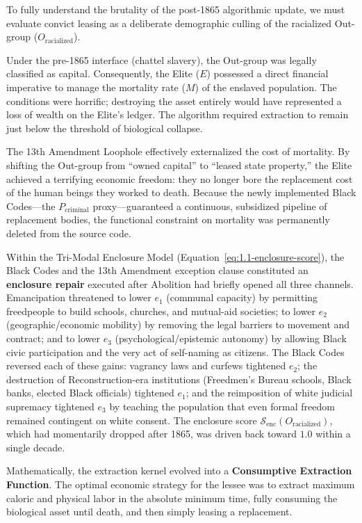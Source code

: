 To fully understand the brutality of the post-1865 algorithmic update, we must evaluate convict leasing as a deliberate demographic culling of the racialized Out-group ($O_{\text{racialized}}$).

Under the pre-1865 interface (chattel slavery), the Out-group was legally classified as capital. Consequently, the Elite ($E$) possessed a direct financial imperative to manage the mortality rate ($M$) of the enslaved population. The conditions were horrific; destroying the asset entirely would have represented a loss of wealth on the Elite's ledger. The algorithm required extraction to remain just below the threshold of biological collapse.

The 13th Amendment Loophole effectively externalized the cost of mortality. By shifting the Out-group from ``owned capital'' to ``leased state property,'' the Elite achieved a terrifying economic freedom: they no longer bore the replacement cost of the human beings they worked to death. Because the newly implemented Black Codes---the $P_{\text{criminal}}$ proxy---guaranteed a continuous, subsidized pipeline of replacement bodies, the functional constraint on mortality was permanently deleted from the source code.

Within the Tri-Modal Enclosure Model (Equation~\ref{eq:1.1-enclosure-score}), the Black Codes and the 13th Amendment exception clause constituted an \textbf{enclosure repair} executed after Abolition had briefly opened all three channels. Emancipation threatened to lower $e_1$ (communal capacity) by permitting freedpeople to build schools, churches, and mutual-aid societies; to lower $e_2$ (geographic/economic mobility) by removing the legal barriers to movement and contract; and to lower $e_3$ (psychological/epistemic autonomy) by allowing Black civic participation and the very act of self-naming as citizens. The Black Codes reversed each of these gains: vagrancy laws and curfews tightened $e_2$; the destruction of Reconstruction-era institutions (Freedmen's Bureau schools, Black banks, elected Black officials) tightened $e_1$; and the reimposition of white judicial supremacy tightened $e_3$ by teaching the population that even formal freedom remained contingent on white consent. The enclosure score \(\mathcal{S}_{\text{enc}}(O_{\text{racialized}})\), which had momentarily dropped after 1865, was driven back toward $1.0$ within a single decade.

Mathematically, the extraction kernel evolved into a \textbf{Consumptive Extraction Function}. The optimal economic strategy for the lessee was to extract maximum caloric and physical labor in the absolute minimum time, fully consuming the biological asset until death, and then simply leasing a replacement.


